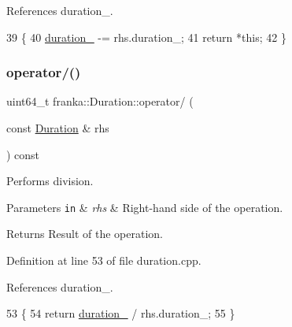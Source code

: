 References duration\+\_\+.


\begin{DoxyCode}
39                                                            \{
40   \hyperlink{classfranka_1_1Duration_ae446c403b200f0dbf92fb51ca21e82ff}{duration\_} -= rhs.duration\_;
41   \textcolor{keywordflow}{return} *\textcolor{keyword}{this};
42 \}
\end{DoxyCode}
\mbox{\label{classfranka_1_1Duration_a90c76be31b53e11f5761416a05d990be}} 
\subsubsection{\texorpdfstring{operator/()}{operator/()}\hspace{0.1cm}{\footnotesize\ttfamily [1/2]}}
{\footnotesize\ttfamily uint64\+\_\+t franka\+::\+Duration\+::operator/ (\begin{DoxyParamCaption}\item[{const \hyperlink{classfranka_1_1Duration}{Duration} \&}]{rhs }\end{DoxyParamCaption}) const\hspace{0.3cm}{\ttfamily [noexcept]}}

Performs division.


\begin{DoxyParams}[1]{Parameters}
\mbox{\tt in}  & {\em rhs} & Right-\/hand side of the operation.\\
\hline
\end{DoxyParams}
\begin{DoxyReturn}{Returns}
Result of the operation. 
\end{DoxyReturn}


Definition at line 53 of file duration.\+cpp.



References duration\+\_\+.


\begin{DoxyCode}
53                                                                \{
54   \textcolor{keywordflow}{return} \hyperlink{classfranka_1_1Duration_ae446c403b200f0dbf92fb51ca21e82ff}{duration\_} / rhs.duration\_;
55 \}
\end{DoxyCode}
\mbox{\label{classfranka_1_1Duration_a15b7299198f36734b62ac98da1ef8c9c}} 
